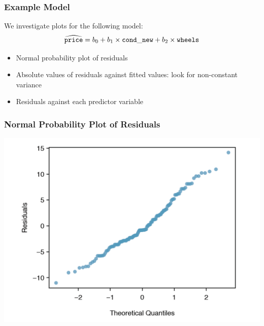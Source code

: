 \documentclass[handout]{beamer}
\begin{document}
\begin{frame}[fragile]
\frametitle{Example Model}
We investigate plots for the following model:
\[
\widehat{{\tt price}} = b_0 + b_1 \times {\tt cond\_new} + b_2 \times {\tt wheels}
\]

\begin{itemize}
\pause\item Normal probability plot of residuals
\pause\item Absolute values of residuals against fitted values: look for non-constant variance
\pause\item Residuals against each predictor variable
\end{itemize}

\end{frame}


\begin{frame}[fragile]
\frametitle{Normal Probability Plot of Residuals}

\begin{center}
\includegraphics[width=\textwidth]{figure/norm_prob_plot.png}
\end{center}

\end{frame}
\end{document}

